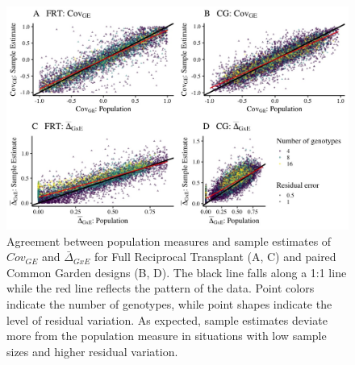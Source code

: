 \documentclass[11pt, oneside]{amsart}
\begin{document}
\renewcommand\thefigure{S2}
\begin{figure}[h]
\begin{center}
\includegraphics[width=6in]{Figs/SampleVsPopulation.jpeg}
\end{center}
\label{Fig: Population vs. Sample Estimates}
\caption[Agreement between population measures and sample estimates of $Cov_{GE}$ and $\bar\Delta_{GxE}$ for Full Reciprocal Transplant (A, C) and paired Common Garden designs (B, D). ]{Agreement between population measures and sample estimates of $Cov_{GE}$ and $\bar\Delta_{GxE}$ for Full Reciprocal Transplant (A, C) and paired Common Garden designs (B, D). The black line falls along a 1:1 line while the red line reflects the pattern of the data. Point colors indicate the number of genotypes, while point shapes indicate the level of residual variation. As expected, sample estimates deviate more from the population measure in situations with low sample sizes and higher residual variation.}
\end{figure}

\clearpage
\newpage
\end{document}
